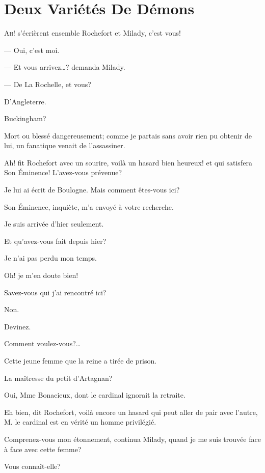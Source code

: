 
\chapter{Deux Variétés De Démons} 
	
\lettrine[ante=«]{A}{h!} s'écrièrent ensemble Rochefort et Milady, c'est vous! 

\zz
\noindent— Oui, c'est moi. 

\zz
\noindent— Et vous arrivez\dots? demanda Milady. 

\zz
\noindent— De La Rochelle, et vous? 

\speak  D'Angleterre. 

\speak  Buckingham? 

\speak  Mort ou blessé dangereusement; comme je partais sans avoir rien pu obtenir de lui, un fanatique venait de l'assassiner. 

\speak  Ah! fit Rochefort avec un sourire, voilà un hasard bien heureux! et qui satisfera Son Éminence! L'avez-vous prévenue? 

\speak  Je lui ai écrit de Boulogne. Mais comment êtes-vous ici? 

\speak  Son Éminence, inquiète, m'a envoyé à votre recherche. 

\speak  Je suis arrivée d'hier seulement. 

\speak  Et qu'avez-vous fait depuis hier? 

\speak  Je n'ai pas perdu mon temps. 

\speak  Oh! je m'en doute bien! 

\speak  Savez-vous qui j'ai rencontré ici? 

\speak  Non. 

\speak  Devinez. 

\speak  Comment voulez-vous?\dots 

\speak  Cette jeune femme que la reine a tirée de prison. 

\speak  La maîtresse du petit d'Artagnan? 

\speak  Oui, Mme Bonacieux, dont le cardinal ignorait la retraite. 

\speak  Eh bien, dit Rochefort, voilà encore un hasard qui peut aller de pair avec l'autre, M. le cardinal est en vérité un homme privilégié. 

\speak  Comprenez-vous mon étonnement, continua Milady, quand je me suis trouvée face à face avec cette femme? 

\speak  Vous connaît-elle? 

